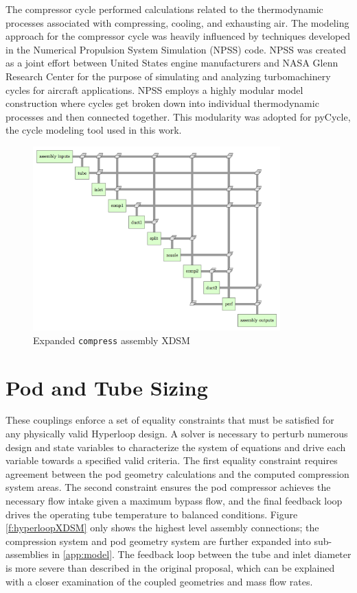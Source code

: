 \documentclass[heading.tex]{subfiles}
\begin{document}
The compressor cycle performed calculations related to the thermodynamic processes associated with compressing, cooling, and exhausting air. 
The modeling approach for the compressor cycle was heavily influenced by techniques developed in the Numerical Propulsion System Simulation (NPSS) code. 
NPSS was created as a joint effort between United States engine manufacturers and NASA Glenn Research Center for the purpose of 
simulating and analyzing turbomachinery cycles for aircraft applications\cite{Lytle}. NPSS employs a highly modular model construction
where cycles get broken down into individual thermodynamic processes and then connected together. This modularity was adopted for pyCycle, 
the cycle modeling tool used in this work. 

\begin{figure}[H]
\centering
\includegraphics[width=0.85\textwidth]{images/compress_assembly_xdsm.png}
\caption{Expanded \texttt{compress} assembly XDSM}
\label{f:compressorXDSM}
\end{figure}




\section{Pod and Tube Sizing}

These couplings enforce a set of equality constraints that must be satisfied for any physically valid Hyperloop design.
A solver is necessary to perturb numerous design and state variables to characterize the system of equations and drive
each variable towards a specified valid criteria. The first equality constraint requires agreement between the pod geometry
calculations and the computed compression system areas. The second constraint ensures the pod compressor achieves the
necessary flow intake given a maximum bypass flow, and the final feedback loop drives the operating tube temperature to
balanced conditions. Figure \ref{f:hyperloopXDSM} only shows the highest level assembly connections;
the compression system and pod geometry system are further expanded into sub-assemblies in \cref{app:model}.
The feedback loop between the tube and inlet diameter is more severe than described in the original proposal,
which can be explained with a closer examination of the coupled geometries and mass flow rates.
\end{document}
